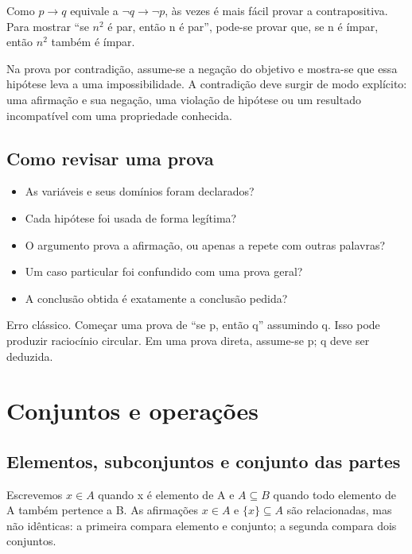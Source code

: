 \documentclass[12pt,a4paper,openany]{book}
\begin{document}
Como $p\to q$ equivale a $\neg q\to\neg p$, às vezes é mais fácil provar a contrapositiva. Para mostrar “se $n^2$ é par, então n é par”, pode-se provar que, se n é ímpar, então $n^2$ também é ímpar.



Na prova por contradição, assume-se a negação do objetivo e mostra-se que essa hipótese leva a uma impossibilidade. A contradição deve surgir de modo explícito: uma afirmação e sua negação, uma violação de hipótese ou um resultado incompatível com uma propriedade conhecida.



\section{Como revisar uma prova}



\begin{itemize}
\item As variáveis e seus domínios foram declarados?
\item Cada hipótese foi usada de forma legítima?
\item O argumento prova a afirmação, ou apenas a repete com outras palavras?
\item Um caso particular foi confundido com uma prova geral?
\item A conclusão obtida é exatamente a conclusão pedida?
\end{itemize}



\begin{exemplo}{Erro clássico.}
Começar uma prova de “se p, então q” assumindo q. Isso pode produzir raciocínio circular. Em uma prova direta, assume-se p; q deve ser deduzida.
\end{exemplo}



\chapter{Conjuntos e operações}



\section{Elementos, subconjuntos e conjunto das partes}



Escrevemos $x\in A$ quando x é elemento de A e $A\subseteq B$ quando todo elemento de A também pertence a B. As afirmações $x\in A$ e $\{x\}\subseteq A$ são relacionadas, mas não idênticas: a primeira compara elemento e conjunto; a segunda compara dois conjuntos.
\end{document}
